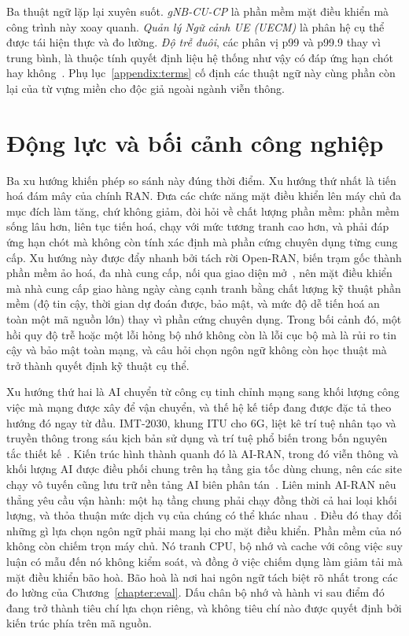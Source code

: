 Ba thuật ngữ lặp lại xuyên suốt. \emph{gNB-CU-CP} là phần mềm mặt điều khiển mà công trình
này xoay quanh. \emph{Quản lý Ngữ cảnh UE (UECM)} là phân hệ cụ thể được tái hiện thực và đo
lường. \emph{Độ trễ đuôi}, các phân vị p99 và p99.9 thay vì trung bình, là thuộc tính quyết
định liệu hệ thống như vậy có đáp ứng hạn chót hay
không~\cite{dean2013tail,barroso2017microseconds}. Phụ lục~\ref{appendix:terms} cố định các
thuật ngữ này cùng phần còn lại của từ vựng miền cho độc giả ngoài ngành viễn thông.

\section{Động lực và bối cảnh công nghiệp}\label{sec:motivation}
Ba xu hướng khiến phép so sánh này đúng thời điểm. Xu hướng thứ nhất là tiến hoá đám mây của
chính RAN. Đưa các chức năng mặt điều khiển lên máy chủ đa mục đích làm tăng, chứ không giảm,
đòi hỏi về chất lượng phần mềm: phần mềm sống lâu hơn, liên tục tiến hoá, chạy với mức tương
tranh cao hơn, và phải đáp ứng hạn chót mà không còn tính xác định mà phần cứng chuyên dụng
từng cung cấp. Xu hướng này được đẩy nhanh bởi tách rời Open-RAN, biến trạm gốc thành phần
mềm ảo hoá, đa nhà cung cấp, nối qua giao diện
mở~\cite{polese2023oran}, nên mặt điều khiển mà nhà cung cấp giao hàng ngày càng cạnh tranh
bằng chất lượng kỹ thuật phần mềm (độ tin cậy, thời gian dự đoán được, bảo mật, và mức độ dễ
tiến hoá an toàn một mã nguồn lớn) thay vì phần cứng chuyên dụng. Trong bối cảnh đó, một hồi
quy độ trễ hoặc một lỗi hỏng bộ nhớ không còn là lỗi cục bộ mà là rủi ro tin cậy và bảo mật
toàn mạng, và câu hỏi chọn ngôn ngữ không còn học thuật mà trở thành quyết định kỹ thuật cụ
thể.

Xu hướng thứ hai là AI chuyển từ công cụ tinh chỉnh mạng sang khối lượng công việc mà mạng
được xây để vận chuyển, và thế hệ kế tiếp đang được đặc tả theo hướng đó ngay từ đầu.
IMT-2030, khung ITU cho 6G, liệt kê trí tuệ nhân tạo và truyền thông trong sáu kịch bản sử
dụng và trí tuệ phổ biến trong bốn nguyên tắc thiết
kế~\cite{itu2023imt2030}. Kiến trúc hình thành quanh đó là AI-RAN, trong đó viễn thông và
khối lượng AI được điều phối chung trên hạ tầng gia tốc dùng chung, nên các site chạy vô
tuyến cũng lưu trữ nền tảng AI biên phân tán~\cite{polese2026airan}. Liên minh AI-RAN nêu
thẳng yêu cầu vận hành: một hạ tầng chung phải chạy đồng thời cả hai loại khối lượng, và
thỏa thuận mức dịch vụ của chúng có thể khác
nhau~\cite{airan2025orchestrator}. Điều đó thay đổi những gì lựa chọn ngôn ngữ phải mang lại
cho mặt điều khiển. Phần mềm của nó không còn chiếm trọn máy chủ. Nó tranh CPU, bộ nhớ và
cache với công việc suy luận có mẫu đến nó không kiểm soát, và đồng ở việc chiếm dụng làm
giảm tải mà mặt điều khiển bão hoà. Bão hoà là nơi hai ngôn ngữ tách biệt rõ nhất trong các
đo lường của Chương~\ref{chapter:eval}. Dấu chân bộ nhớ và hành vi sau điểm đó đang trở thành
tiêu chí lựa chọn riêng, và không tiêu chí nào được quyết định bởi kiến trúc phía trên mã
nguồn.


